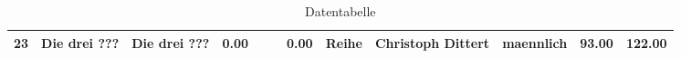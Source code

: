 \begin{table}
\begin{center}
{\begin{tabular}{rllrllrlllrr}
  23 & Die drei ???                                                                                                                                                                                                                                                    & Die drei ???                                                                                                                                                                                                                                                    & 0.00 &                                                                                                                                                                                                                                                                 &                                                                                                                                                                                                                                                                 & 0.00 & Reihe & Christoph Dittert                                                                                                                                                                                                                                               & maennlich & 93.00 & 122.00 \\ 
   \hline
\end{tabular}
}
\caption{Datentabelle}
\label{merkmale}
\end{center}
\end{table}%
